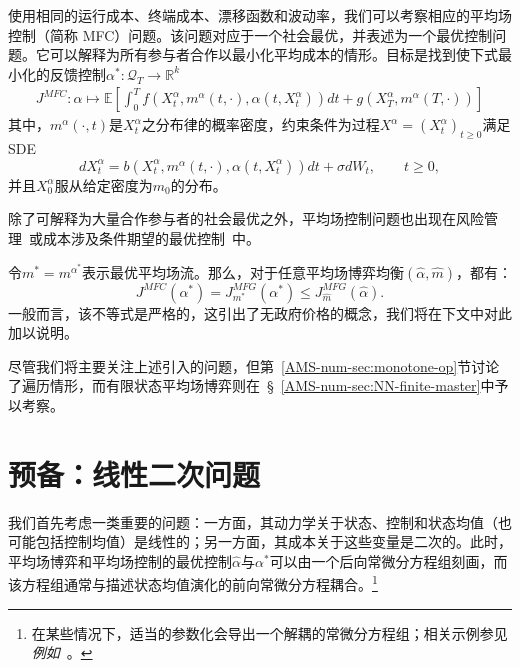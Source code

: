 \documentclass{amsproc}
\theoremstyle{definition}
\theoremstyle{remark}
\numberwithin{equation}{section}
\newcommand{\EE}{{\mathbb E}}
\newcommand{\RR}{{\mathbb R}}
\newcommand{\ctrl}{\alpha}
\newcommand{\ctrldim}{k}
\newcommand{\domT}{\mathcal{Q}_{T}}
\begin{document}
使用相同的运行成本、终端成本、漂移函数和波动率，我们可以考察相应的平均场控制（简称 MFC）问题。该问题对应于一个社会最优，并表述为一个最优控制问题。它可以解释为所有参与者合作以最小化平均成本的情形。目标是找到使下式最小化的反馈控制$\ctrl^*: \domT\to \RR^\ctrldim$
\begin{align}
\label{AMS-num-eq:def-J-MFC}
	J^{MFC}: \ctrl \mapsto \EE \left[\int_0^T f(X_t^{\ctrl}, m^{\ctrl}(t,\cdot), \ctrl(t,X_t^{\ctrl}) ) dt + g(X_T^{\ctrl}, m^{\ctrl}(T,\cdot)) \right]
\end{align}
其中，$m^{\ctrl}(\cdot, t)$是$X_t^{\ctrl}$之分布律的概率密度，约束条件为过程$X^{\ctrl} = (X_t^{\ctrl})_{t \ge 0}$满足 SDE
\begin{equation}
\label{AMS-num-eq:dyn-X-general-MFC}
	d X_t^{\ctrl} = b(X_t^{\ctrl}, m^{\ctrl}(t,\cdot), \ctrl(t, X_t^{\ctrl})) dt + \sigma d W_t, \qquad t \ge 0,
\end{equation}
并且$X_0^{\ctrl}$服从给定密度为$m_0$的分布。 

除了可解释为大量合作参与者的社会最优之外，平均场控制问题也出现在风险管理~\cite{MR2784835}或成本涉及条件期望的最优控制~\cite{MR4133380,achdoulaurierelions2020optimal}中。

令$m^* = m^{\ctrl^*}$表示最优平均场流。那么，对于任意平均场博弈均衡$(\hat\ctrl, \hat m )$，都有：
$$
	J^{MFC}(\ctrl^*) = J^{MFG}_{m^*}(\ctrl^*) \leq J^{MFG}_{\hat{m}}(\hat{\ctrl}).
$$
一般而言，该不等式是严格的，这引出了无政府价格的概念，我们将在下文中对此加以说明。

尽管我们将主要关注上述引入的问题，但第~\ref{AMS-num-sec:monotone-op}节讨论了遍历情形，而有限状态平均场博弈则在~\S~\ref{AMS-num-sec:NN-finite-master}中予以考察。 






\clearpage




\section{\bf 预备：线性二次问题}
\label{AMS-num-sec:LQ}

我们首先考虑一类重要的问题：一方面，其动力学关于状态、控制和状态均值（也可能包括控制均值）是线性的；另一方面，其成本关于这些变量是二次的。此时，平均场博弈和平均场控制的最优控制$\hat\ctrl$与$\ctrl^*$可以由一个后向常微分方程组刻画，而该方程组通常与描述状态均值演化的前向常微分方程耦合。\footnote{在某些情况下，适当的参数化会导出一个解耦的常微分方程组；相关示例参见\textit{例如}~\cite{gravesmalhame-AMS-tmp}。}
\end{document}
